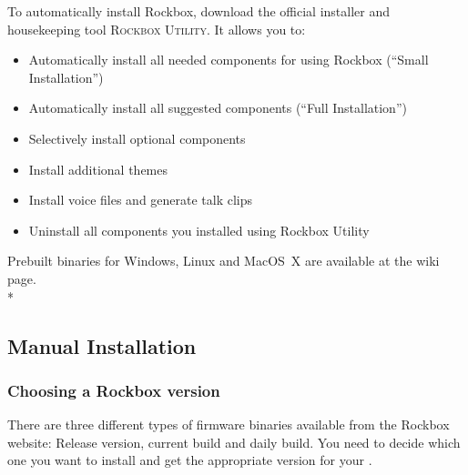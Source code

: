 To automatically install Rockbox, download the official installer and
housekeeping tool \textsc{Rockbox Utility}. It allows you to:
\begin{itemize}
\item Automatically install all needed components for using Rockbox
        (``Small Installation'')
\item Automatically install all suggested components (``Full Installation'')
\item Selectively install optional components
\item Install additional themes
\item Install voice files and generate talk clips
\item Uninstall all components you installed using Rockbox Utility
\end{itemize}
Prebuilt binaries for Windows, Linux and MacOS~X are
available at the  wiki page.
\\*

    {
}


\subsection{Manual Installation}

\subsubsection{Choosing a Rockbox version}\label{sec:choosing_version}

There are three different types of firmware binaries available from the
Rockbox website:
\label{Version}
Release version, current build and daily build. You need to decide which one
you want to install and get the appropriate version for your \dap{}.

